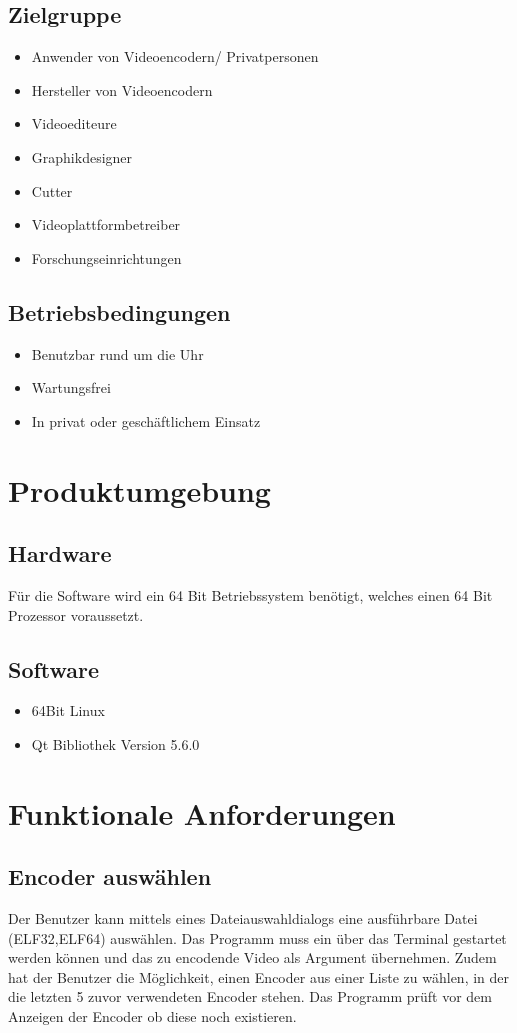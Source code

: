 \documentclass[parskip=full]{scrartcl}
\begin{document}
\subsection{Zielgruppe}
\begin{itemize}
\item Anwender von Videoencodern/ Privatpersonen
\item Hersteller von Videoencodern
\item Videoediteure
\item Graphikdesigner
\item Cutter
\item Videoplattformbetreiber
\item Forschungseinrichtungen
\end{itemize}
\subsection{Betriebsbedingungen}
\begin{itemize}
\item Benutzbar rund um die Uhr
\item Wartungsfrei
\item In privat oder geschäftlichem Einsatz
\end{itemize}
\section{Produktumgebung}

\subsection{Hardware}
Für die Software wird ein 64 Bit Betriebssystem benötigt, welches einen 64 Bit Prozessor voraussetzt.

\subsection{Software}
\begin{itemize}
\item 64Bit Linux
\item Qt Bibliothek Version 5.6.0
\end{itemize}

\section{Funktionale Anforderungen}
\subsection{Encoder auswählen}
Der Benutzer kann mittels eines Dateiauswahldialogs eine ausführbare Datei (ELF32,ELF64) auswählen.
Das Programm muss ein über das Terminal gestartet werden können und das zu encodende Video als
Argument übernehmen.
Zudem hat der Benutzer die Möglichkeit, einen Encoder aus einer Liste zu wählen, in der die letzten 5 zuvor
verwendeten Encoder stehen. Das Programm prüft vor dem Anzeigen der Encoder ob diese noch existieren.
\end{document}
